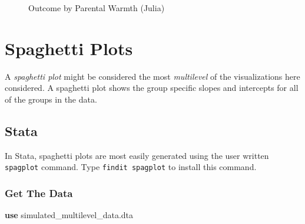 \documentclass[
  letterpaper,
  DIV=11,
  numbers=noendperiod]{scrreprt}
\newenvironment{Shaded}{\begin{snugshade}}{\end{snugshade}}
\newcommand{\KeywordTok}[1]{\textcolor[rgb]{0.00,0.23,0.31}{\textbf{#1}}}
\newcommand{\NormalTok}[1]{\textcolor[rgb]{0.00,0.23,0.31}{#1}}
\begin{document}
\begin{figure}[H]


\caption{\label{fig-Julialfit}Outcome by Parental Warmth (Julia)}

\end{figure}%

\section{Spaghetti Plots}\label{spaghetti-plots}

A \emph{spaghetti plot} might be considered the most \emph{multilevel}
of the visualizations here considered. A spaghetti plot shows the group
specific slopes and intercepts for all of the groups in the data.

\subsection{Stata}

In Stata, spaghetti plots are most easily generated using the user
written \texttt{spagplot} command. Type \texttt{findit\ spagplot} to
install this command.

\subsubsection{Get The Data}\label{get-the-data-6}

\begin{Shaded}
\begin{Highlighting}[]

\KeywordTok{use}\NormalTok{ simulated\_multilevel\_data.dta}
\end{Highlighting}
\end{Shaded}
\end{document}
